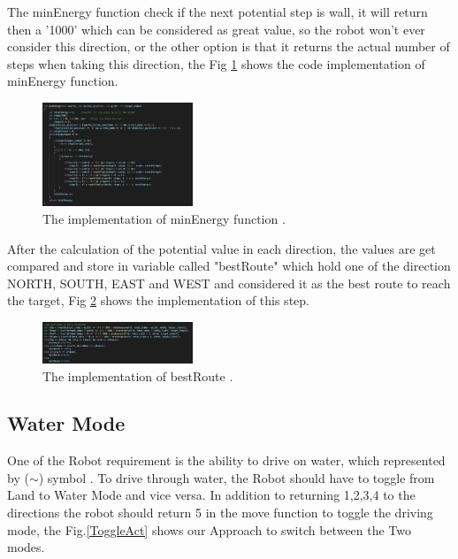 \documentclass[10pt,journal,compsoc]{IEEEtran}
\begin{document}
The minEnergy function check if the next potential step is wall, it will return then a '1000' which can be considered as great value, so the robot won't ever consider this direction, or the other option is that it returns the actual number of steps when taking this direction, the Fig \ref{MinEnCode} shows the code implementation of minEnergy function.


\begin{figure}[!h]
	
	\centering
	\includegraphics[width=0.4\textwidth]{MinEnergyCode.png}
	\caption{\label{MinEnCode}The implementation of minEnergy function  .}
	
\end{figure}

After the calculation  of the potential value in each direction, the values are get compared  and store in variable called "bestRoute" which hold one of the direction NORTH, SOUTH, EAST and WEST and considered it as the best route to reach the target, Fig \ref{MinstepsCode} shows the implementation of this step. 


\begin{figure}[!h]
	
	\centering
	\includegraphics[width=0.4\textwidth]{minStepsCode.png}
	\caption{\label{MinstepsCode}The implementation of bestRoute  .}
	
\end{figure}



\subsection{Water Mode }


One of the Robot requirement is the ability to drive on water, which represented by  ($\sim$) symbol . To drive through water, the Robot should have to  toggle from Land to Water Mode and vice versa.  In addition to returning  1,2,3,4 to the directions  the robot should return 5 in the
move function to toggle the driving mode, the Fig.\ref{ToggleAct} shows our Approach to switch between the Two modes. 
\end{document}

